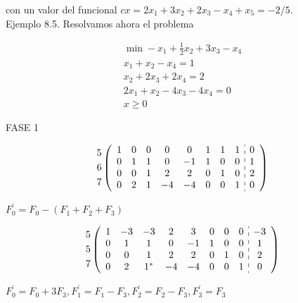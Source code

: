 \documentclass[10pt]{article}
\begin{document}
con un valor del funcional $c x=2 x_{1}+3 x_{2}+2 x_{3}-x_{4}+x_{5}=-2 / 5$.\\
Ejemplo 8.5. Resolvamos ahora el problema

$$
\begin{gathered}
\min -x_{1}+\frac{1}{2} x_{2}+3 x_{3}-x_{4} \\
x_{1}+x_{2}-x_{4}=1 \\
x_{2}+2 x_{3}+2 x_{4}=2 \\
2 x_{1}+x_{2}-4 x_{3}-4 x_{4}=0 \\
x \geq 0
\end{gathered}
$$

FASE 1

$$
\begin{aligned}
& 5 \\
& 6 \\
& 7
\end{aligned}\left(\begin{array}{cccccccc:c}
1 & 0 & 0 & 0 & 0 & 1 & 1 & 1 & 0 \\
0 & 1 & 1 & 0 & -1 & 1 & 0 & 0 & 1 \\
0 & 0 & 1 & 2 & 2 & 0 & 1 & 0 & 2 \\
0 & 2 & 1 & -4 & -4 & 0 & 0 & 1 & 0
\end{array}\right)
$$

$F_{0}^{\prime}=F_{0}-\left(F_{1}+F_{2}+F_{3}\right)$

$$
\begin{aligned}
& 5 \\
& 5 \\
& 7
\end{aligned}\left(\begin{array}{cccccccc:c}
1 & -3 & -3 & 2 & 3 & 0 & 0 & 0 & -3 \\
0 & 1 & 1 & 0 & -1 & 1 & 0 & 0 & 1 \\
0 & 0 & 1 & 2 & 2 & 0 & 1 & 0 & 2 \\
0 & 2 & 1^{*} & -4 & -4 & 0 & 0 & 1 & 0
\end{array}\right)
$$

$F_{0}^{\prime}=F_{0}+3 F_{3}, F_{1}^{\prime}=F_{1}-F_{3}, F_{2}^{\prime}=F_{2}-F_{3}, F_{3}^{\prime}=F_{3}$
\end{document}
